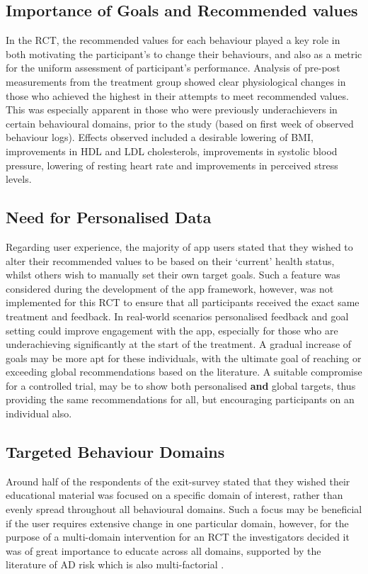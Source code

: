 \subsection{Importance of Goals and Recommended values}
In the RCT, the recommended values for each behaviour played a key role in both motivating the participant's to change their behaviours, and also as a metric for the uniform assessment of participant's performance. Analysis of pre-post measurements from the treatment group showed clear physiological changes in those who achieved the highest in their attempts to meet recommended values. This was especially apparent in those who were previously underachievers in certain behavioural domains, prior to the study (based on first week of observed behaviour logs). Effects observed included a desirable lowering of BMI, improvements in HDL and LDL cholesterols, improvements in systolic blood pressure, lowering of resting heart rate and improvements in perceived stress levels.

\subsection{Need for Personalised Data} \label{subsection: finding-need-personalised}
Regarding user experience, the majority of app users stated that they wished to alter their recommended values to be based on their ‘current’ health status, whilst others wish to manually set their own target goals. Such a feature was considered during the development of the app framework, however, was not implemented for this RCT to ensure that all participants received the exact same treatment and feedback.
In real-world scenarios personalised feedback and goal setting  could improve engagement with the app, especially for those who are underachieving significantly at the start of the treatment. A gradual increase of goals may be more apt for these individuals, with the ultimate goal of reaching or exceeding global recommendations based on the literature.
A suitable compromise for a controlled trial, may be to show both personalised \textbf{and} global targets, thus providing the same recommendations for all, but encouraging participants on an individual also.

\subsection{Targeted Behaviour Domains}
Around half of the respondents of the exit-survey stated that they wished  their educational material was focused on a specific domain of interest, rather than evenly spread throughout all behavioural domains. Such a focus may be beneficial if the user requires extensive change in one particular domain, however, for the purpose of a multi-domain intervention for an RCT the investigators decided it was of great importance to educate across all domains, supported by the literature of AD risk which is also multi-factorial \cite{Mangialasche2012}.

